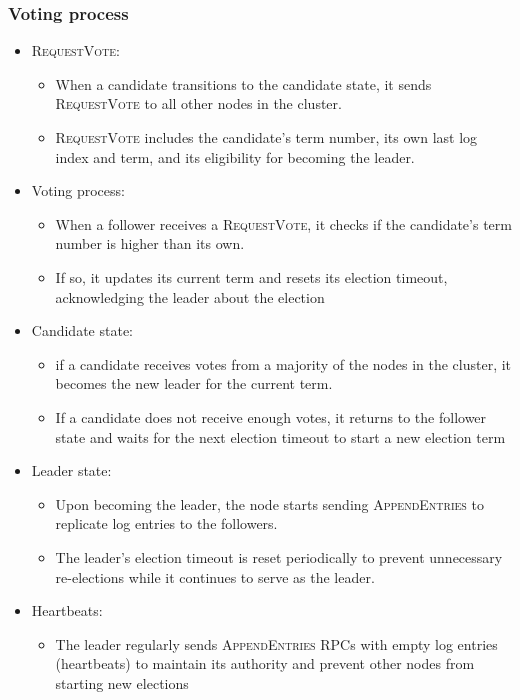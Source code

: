 \subsubsection{Voting process}
\begin{itemize}
   \item \textsc{RequestVote}:
   \begin{itemize}
   	\item When a candidate transitions to the candidate state, it sends \textsc{RequestVote} to all other nodes in the cluster.
	   \item \textsc{RequestVote} includes the candidate’s term number, its own last log index and term, and its eligibility for becoming the leader.
   \end{itemize}
   \item Voting process:
   \begin{itemize}
   	\item When a follower receives a \textsc{RequestVote}, it checks if the candidate’s term number is higher than its own.
	   \item If so, it updates its current term and resets its election timeout, acknowledging the leader about the election
   \end{itemize}
   \item Candidate state:
   \begin{itemize}
	   \item if a candidate receives votes from a majority of the nodes in the cluster, it becomes the new leader for the current term.
	   \item If a candidate does not receive enough votes, it returns to the follower state and waits for the next election timeout to start a new election term
   \end{itemize}
   \item Leader state:
   \begin{itemize}
	   \item Upon becoming the leader, the node starts sending \textsc{AppendEntries} to replicate log entries to the followers.
	   \item The leader's election timeout is reset periodically to prevent unnecessary re-elections while it continues to serve as the leader.
   \end{itemize}
   \item Heartbeats:
   \begin{itemize}
      \item The leader regularly sends \textsc{AppendEntries} RPCs with empty log entries (heartbeats) to maintain its authority and prevent other nodes from starting new elections
   \end{itemize}
\end{itemize}

